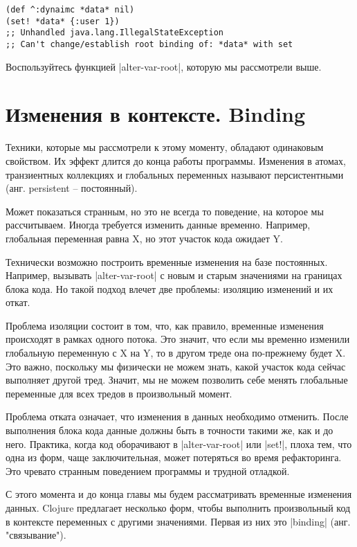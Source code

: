 \begin{verbatim}
(def ^:dynaimc *data* nil)
(set! *data* {:user 1})
;; Unhandled java.lang.IllegalStateException
;; Can't change/establish root binding of: *data* with set
\end{verbatim}

Воспользуйтесь функцией \spverb|alter-var-root|, которую мы рассмотрели выше.

\section{Изменения в контексте. Binding}

Техники, которые мы рассмотрели к этому моменту, обладают одинаковым
свойством. Их эффект длится до конца работы программы. Изменения в атомах,
транзиентных коллекциях и глобальных переменных называют персистентными
(анг. persistent -- постоянный).

Может показаться странным, но это не всегда то поведение, на которое мы
рассчитываем. Иногда требуется изменить данные временно. Например, глобальная
переменная равна X, но этот участок кода ожидает Y.

Технически возможно построить временные изменения на базе постоянных. Например,
вызывать \spverb|alter-var-root| с новым и старым значениями на границах блока кода. Но
такой подход влечет две проблемы: изоляцию изменений и их откат.

Проблема изоляции состоит в том, что, как правило, временные изменения
происходят в рамках одного потока. Это значит, что если мы временно изменили
глобальную переменную с X на Y, то в другом треде она по-прежнему будет X. Это
важно, поскольку мы физически не можем знать, какой участок кода сейчас
выполняет другой тред. Значит, мы не можем позволить себе менять глобальные
переменные для всех тредов в произвольный момент.

Проблема отката означает, что изменения в данных необходимо отменить. После
выполнения блока кода данные должны быть в точности такими же, как и до
него. Практика, когда код оборачивают в \spverb|alter-var-root| или \spverb|set!|, плоха тем,
что одна из форм, чаще заключительная, может потеряться во время
рефакторинга. Это чревато странным поведением программы и трудной отладкой.

С этого момента и до конца главы мы будем рассматривать временные изменения
данных. Clojure предлагает несколько форм, чтобы выполнить произвольный код в
контексте переменных с другими значениями. Первая из них это \spverb|binding|
(анг. "связывание").

